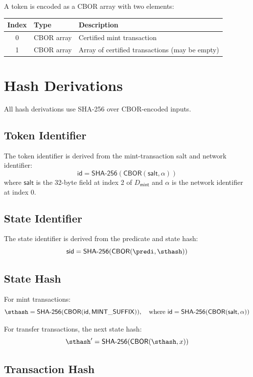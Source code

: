 A token is encoded as a CBOR array with two elements:

\begin{longtable}{clp{8cm}}
\textbf{Index} & \textbf{Type} & \textbf{Description} \\
\hline
0 & CBOR array & Certified mint transaction \\
1 & CBOR array & Array of certified transactions (may be empty) \\
\end{longtable}


\section{Hash Derivations}\label{app:hash-derivations}

All hash derivations use SHA-256 over CBOR-encoded inputs.

\subsection{Token Identifier}

The token identifier is derived from the mint-transaction salt and network identifier:
\[
\mathsf{id} = \mathsf{SHA\text{-}256}(\mathsf{CBOR}(\mathsf{salt}, \alpha))
\]
where $\mathsf{salt}$ is the 32-byte field at index 2 of $D_\mathsf{mint}$ and $\alpha$ is the network identifier at index 0.

\subsection{State Identifier}

The state identifier is derived from the predicate and state hash:
\[
\mathsf{sid} = \mathsf{SHA\text{-}256}(\mathsf{CBOR}(\predi, \sthash))
\]

\subsection{State Hash}

For mint transactions:
\[
\sthash = \mathsf{SHA\text{-}256}(\mathsf{CBOR}(\mathsf{id}, \mathsf{MINT\_SUFFIX})), \quad \text{where } \mathsf{id} = \mathsf{SHA\text{-}256}(\mathsf{CBOR}(\mathsf{salt}, \alpha))
\]

For transfer transactions, the next state hash:
\[
\sthash' = \mathsf{SHA\text{-}256}(\mathsf{CBOR}(\sthash, x))
\]

\subsection{Transaction Hash} %

